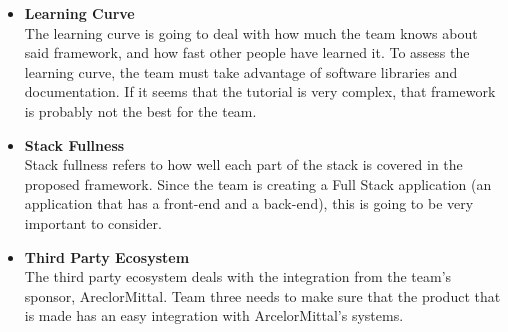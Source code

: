 \documentclass[Letter,11pt]{article}
\begin{document}
		\begin{minipage}[t]{0.5\textwidth}
		\begin{itemize}
			\item \textbf{Learning Curve} \\
			The learning curve is going to deal with how much the team knows about said framework, and how fast other people have learned it. To assess the learning curve, the team must take advantage of software libraries and documentation. If it seems that the tutorial is very complex, that framework is probably not the best for the team. 
			\item \textbf{Stack Fullness} \\
			Stack fullness refers to how well each part of the stack is covered in the proposed framework. Since the team is creating a Full Stack application (an application that has a front-end and a back-end), this is going to be very important to consider.
			\item \textbf{Third Party Ecosystem}\\
			The third party ecosystem deals with the integration from the team's sponsor, AreclorMittal. Team three needs to make sure that the product that is made has an easy integration with ArcelorMittal's systems. 
		\end{itemize}
		\end{minipage}\\
		\\
\end{document}
